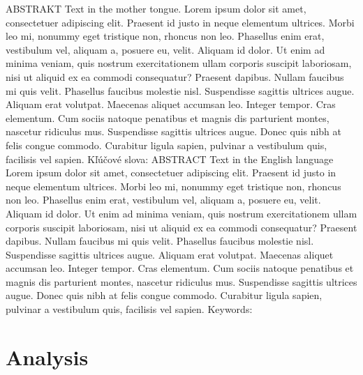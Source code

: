 \documentclass[12pt]{article}
\begin{document}
ABSTRAKT
Text in the mother tongue.
Lorem ipsum dolor sit amet, consectetuer adipiscing elit. Praesent id justo in neque elementum ultrices. Morbi leo mi, nonummy eget tristique non, rhoncus non leo. Phasellus enim erat, vestibulum vel, aliquam a, posuere eu, velit. Aliquam id dolor. Ut enim ad minima veniam, quis nostrum exercitationem ullam corporis suscipit laboriosam, nisi ut aliquid ex ea commodi consequatur? Praesent dapibus. Nullam faucibus mi quis velit. Phasellus faucibus molestie nisl. Suspendisse sagittis ultrices augue. Aliquam erat volutpat. Maecenas aliquet accumsan leo. Integer tempor. Cras elementum. Cum sociis natoque penatibus et magnis dis parturient montes, nascetur ridiculus mus. Suspendisse sagittis ultrices augue. Donec quis nibh at felis congue commodo. Curabitur ligula sapien, pulvinar a vestibulum quis, facilisis vel sapien.
Kľúčové slova: 
ABSTRACT
Text in the English language
Lorem ipsum dolor sit amet, consectetuer adipiscing elit. Praesent id justo in neque elementum ultrices. Morbi leo mi, nonummy eget tristique non, rhoncus non leo. Phasellus enim erat, vestibulum vel, aliquam a, posuere eu, velit. Aliquam id dolor. Ut enim ad minima veniam, quis nostrum exercitationem ullam corporis suscipit laboriosam, nisi ut aliquid ex ea commodi consequatur? Praesent dapibus. Nullam faucibus mi quis velit. Phasellus faucibus molestie nisl. Suspendisse sagittis ultrices augue. Aliquam erat volutpat. Maecenas aliquet accumsan leo. Integer tempor. Cras elementum. Cum sociis natoque penatibus et magnis dis parturient montes, nascetur ridiculus mus. Suspendisse sagittis ultrices augue. Donec quis nibh at felis congue commodo. Curabitur ligula sapien, pulvinar a vestibulum quis, facilisis vel sapien.
Keywords:


    \chapter{Analysis}\label{analysis}
\end{document}
